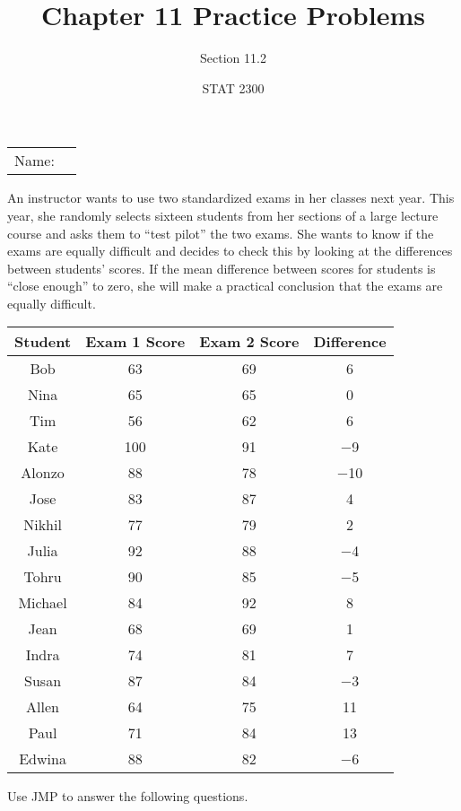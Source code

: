 \documentclass[noanswers]{exam}
\title{Chapter 11 Practice Problems}
\author{Section 11.2}
\date{STAT 2300}
\begin{document}
\noindent\begin{tabular}{@{}p{.3in}p{3in}@{}}
Name: & \hrulefill
\end{tabular}

\vspace{2mm}

\noindent An instructor wants to use two standardized exams in her classes next year. This year, she randomly selects sixteen students from her sections of a large lecture course and asks them to ``test pilot'' the two exams. She wants to know if the exams are equally difficult and decides to check this by looking at the differences between students' scores. If the mean difference between scores for students is ``close enough'' to zero, she will make a practical conclusion that the exams are equally difficult.

\vspace{1mm}

\begin{center}
\begin{tabular}{|c|c|c|c|}
\hline
\textbf{Student} & \textbf{Exam 1 Score} & \textbf{Exam 2 Score} & \textbf{Difference} \\
\hline
Bob & 63 & 69 & 6 \\ 
\hline
Nina & 65 & 65 & 0 \\
\hline
Tim & 56 & 62 & 6 \\
\hline
Kate & 100 & 91 & $-$9 \\
\hline
Alonzo & 88 & 78 & $-$10 \\ 
\hline
Jose & 83 & 87 & 4 \\
\hline
Nikhil & 77 & 79 & 2 \\ 
\hline 
Julia & 92 & 88 & $-$4 \\ 
\hline
Tohru & 90 & 85 & $-$5 \\
\hline 
Michael & 84 & 92 & 8 \\
\hline
Jean & 68 & 69 & 1 \\
\hline
Indra & 74 & 81 & 7 \\
\hline 
Susan & 87 & 84 & $-$3 \\
\hline
Allen & 64 & 75 & 11 \\
\hline
Paul & 71 & 84 & 13 \\
\hline 
Edwina & 88 & 82 & $-$6 \\
\hline
\end{tabular}
\end{center}

\vspace{2mm}

\noindent Use JMP to answer the following questions.
\end{document}
